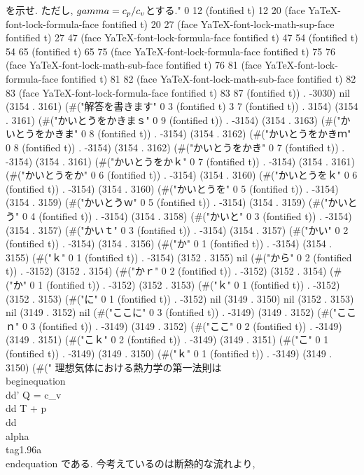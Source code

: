  を示せ. ただし, $\\gamma=c_p / c_v$とする." 0 12 (fontified t) 12 20 (face YaTeX-font-lock-formula-face fontified t) 20 27 (face YaTeX-font-lock-math-sup-face fontified t) 27 47 (face YaTeX-font-lock-formula-face fontified t) 47 54 (fontified t) 54 65 (fontified t) 65 75 (face YaTeX-font-lock-formula-face fontified t) 75 76 (face YaTeX-font-lock-math-sub-face fontified t) 76 81 (face YaTeX-font-lock-formula-face fontified t) 81 82 (face YaTeX-font-lock-math-sub-face fontified t) 82 83 (face YaTeX-font-lock-formula-face fontified t) 83 87 (fontified t)) . -3030) nil (3154 . 3161) (#("解答を書きます" 0 3 (fontified t) 3 7 (fontified t)) . 3154) (3154 . 3161) (#("かいとうをかきまｓ" 0 9 (fontified t)) . -3154) (3154 . 3163) (#("かいとうをかきま" 0 8 (fontified t)) . -3154) (3154 . 3162) (#("かいとうをかきｍ" 0 8 (fontified t)) . -3154) (3154 . 3162) (#("かいとうをかき" 0 7 (fontified t)) . -3154) (3154 . 3161) (#("かいとうをかｋ" 0 7 (fontified t)) . -3154) (3154 . 3161) (#("かいとうをか" 0 6 (fontified t)) . -3154) (3154 . 3160) (#("かいとうをｋ" 0 6 (fontified t)) . -3154) (3154 . 3160) (#("かいとうを" 0 5 (fontified t)) . -3154) (3154 . 3159) (#("かいとうｗ" 0 5 (fontified t)) . -3154) (3154 . 3159) (#("かいとう" 0 4 (fontified t)) . -3154) (3154 . 3158) (#("かいと" 0 3 (fontified t)) . -3154) (3154 . 3157) (#("かいｔ" 0 3 (fontified t)) . -3154) (3154 . 3157) (#("かい" 0 2 (fontified t)) . -3154) (3154 . 3156) (#("か" 0 1 (fontified t)) . -3154) (3154 . 3155) (#("ｋ" 0 1 (fontified t)) . -3154) (3152 . 3155) nil (#("から" 0 2 (fontified t)) . -3152) (3152 . 3154) (#("かｒ" 0 2 (fontified t)) . -3152) (3152 . 3154) (#("か" 0 1 (fontified t)) . -3152) (3152 . 3153) (#("ｋ" 0 1 (fontified t)) . -3152) (3152 . 3153) (#("に" 0 1 (fontified t)) . -3152) nil (3149 . 3150) nil (3152 . 3153) nil (3149 . 3152) nil (#("ここに" 0 3 (fontified t)) . -3149) (3149 . 3152) (#("ここｎ" 0 3 (fontified t)) . -3149) (3149 . 3152) (#("ここ" 0 2 (fontified t)) . -3149) (3149 . 3151) (#("こｋ" 0 2 (fontified t)) . -3149) (3149 . 3151) (#("こ" 0 1 (fontified t)) . -3149) (3149 . 3150) (#("ｋ" 0 1 (fontified t)) . -3149) (3149 . 3150) (#("
理想気体における熱力学の第一法則は
\\begin{equation}
 \\dd' Q = c_v\\dd T + p\\dd\\alpha \\tag{1.96a}
\\end{equation}
である. 今考えているのは断熱的な流れより,
